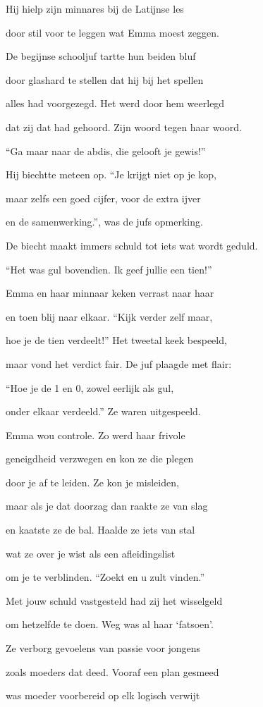 Hij hielp zijn minnares
bij de Latijnse les

door stil voor te leggen
wat Emma moest zeggen.

De begijnse schooljuf
tartte hun beiden bluf

door glashard te stellen
dat hij bij het spellen

alles had voorgezegd.
Het werd door hem weerlegd

dat zij dat had gehoord.
Zijn woord tegen haar woord.

“Ga maar naar de abdis,
die gelooft je gewis!”

Hij biechtte meteen op.
“Je krijgt niet op je kop,

maar zelfs een goed cijfer,
voor de extra ijver

en de samenwerking.”,
was de jufs opmerking.

De biecht maakt immers schuld
tot iets wat wordt geduld.

“Het was gul bovendien.
Ik geef jullie een tien!”

Emma en haar minnaar
keken verrast naar haar

en toen blij naar elkaar.
“Kijk verder zelf maar,

hoe je de tien verdeelt!”
Het tweetal keek bespeeld,

maar vond het verdict fair.
De juf plaagde met flair:

“Hoe je de 1 en 0,
zowel eerlijk als gul,

onder elkaar verdeeld.”
Ze waren uitgespeeld.

Emma wou controle.
Zo werd haar frivole

geneigdheid verzwegen
en kon ze die plegen

door je af te leiden.
Ze kon je misleiden,

maar als je dat doorzag
dan raakte ze van slag

en kaatste ze de bal.
Haalde ze iets van stal

wat ze over je wist
als een afleidingslist

om je te verblinden.
“Zoekt en u zult vinden.”

Met jouw schuld vastgesteld
had zij het wisselgeld

om hetzelfde te doen.
Weg was al haar ‘fatsoen’.

Ze verborg gevoelens
van passie voor jongens

zoals moeders dat deed.
Vooraf een plan gesmeed

was moeder voorbereid
op elk logisch verwijt

